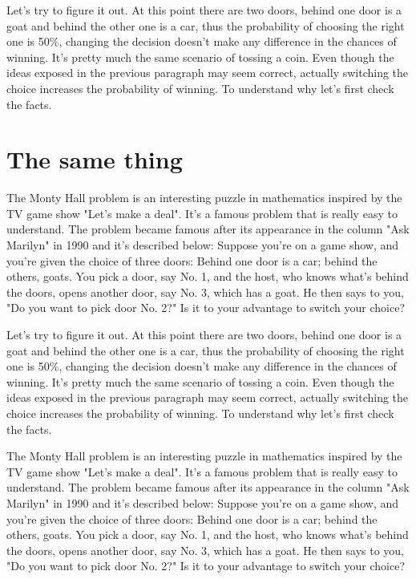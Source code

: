\documentclass[preprint]{oscmjournal}
\begin{document}
Let's try to figure it out. At this point there are two doors, behind one door is a goat  and behind the other one is a car, thus the probability of choosing the right one is 50\%, changing the decision doesn't make any difference in the chances of winning. It's pretty much the same scenario of tossing a coin. Even though the ideas exposed in the previous paragraph may seem correct, actually switching the choice increases the probability of winning. To understand why let's  first check the facts.


\section{The same thing}

The Monty Hall problem is an interesting puzzle in mathematics inspired by the TV  game show "Let's make a deal". It's a famous problem that is really easy to understand. The problem became famous after its appearance in the column "Ask Marilyn" in 1990 and  it's described below: Suppose you're on a game show, and you're given the choice of three doors: Behind one  door is a car; behind the others, goats. You pick a door, say No. 1, and the host, who  knows what's behind the doors, opens another door, say No. 3, which has a goat. He then  says to you, "Do you want to pick door No. 2?" Is it to your advantage to switch your choice?

Let's try to figure it out. At this point there are two doors, behind one door is a goat  and behind the other one is a car, thus the probability of choosing the right one is 50\%, changing the decision doesn't make any difference in the chances of winning. It's pretty much the same scenario of tossing a coin. Even though the ideas exposed in the previous paragraph may seem correct, actually switching the choice increases the probability of winning. To understand why let's  first check the facts.

The Monty Hall problem is an interesting puzzle in mathematics inspired by the TV  game show "Let's make a deal". It's a famous problem that is really easy to understand. The problem became famous after its appearance in the column "Ask Marilyn" in 1990 and  it's described below: Suppose you're on a game show, and you're given the choice of three doors: Behind one  door is a car; behind the others, goats. You pick a door, say No. 1, and the host, who  knows what's behind the doors, opens another door, say No. 3, which has a goat. He then  says to you, "Do you want to pick door No. 2?" Is it to your advantage to switch your choice?
\end{document}
